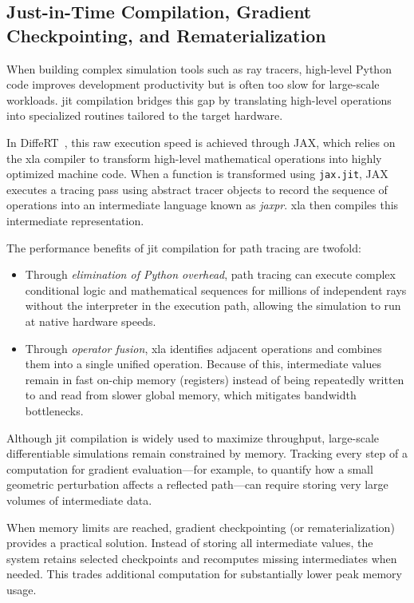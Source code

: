 \subsection{Just-in-Time Compilation, Gradient Checkpointing, and Rematerialization}

When building complex simulation tools such as ray tracers, high-level Python code improves development productivity but is often too slow for large-scale workloads. \gls{jit} compilation bridges this gap by translating high-level operations into specialized routines tailored to the target hardware.

In DiffeRT~, this raw execution speed is achieved through JAX, which relies on the \gls{xla} compiler to transform high-level mathematical operations into highly optimized machine code. When a function is transformed using \texttt{jax.jit}, JAX executes a tracing pass using abstract tracer objects to record the sequence of operations into an intermediate language known as \textit{jaxpr}. \gls{xla} then compiles this intermediate representation.

The performance benefits of \gls{jit} compilation for path tracing are twofold:
\begin{itemize}
  \item Through \emph{elimination of Python overhead}, path tracing can execute complex conditional logic and mathematical sequences for millions of independent rays without the interpreter in the execution path, allowing the simulation to run at native hardware speeds.
  \item Through \emph{operator fusion}, \gls{xla} identifies adjacent operations and combines them into a single unified operation. Because of this, intermediate values remain in fast on-chip memory (registers) instead of being repeatedly written to and read from slower global memory, which mitigates bandwidth bottlenecks.
\end{itemize}

Although \gls{jit} compilation is widely used to maximize throughput, large-scale differentiable simulations remain constrained by memory. Tracking every step of a computation for gradient evaluation---for example, to quantify how a small geometric perturbation affects a reflected path---can require storing very large volumes of intermediate data.

When memory limits are reached, gradient checkpointing (or rematerialization) provides a practical solution. Instead of storing all intermediate values, the system retains selected checkpoints and recomputes missing intermediates when needed. This trades additional computation for substantially lower peak memory usage.

